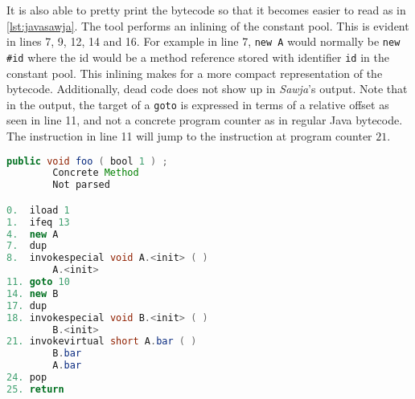 It is also able to pretty print the bytecode so that it becomes easier to read as in \cref{lst:javasawja}. 
The tool performs an inlining of the constant pool. This is evident in lines 7, 9, 12, 14 and 16. For example in line 7, \texttt{new A} would normally be \texttt{new \#id} where the id would be a method reference stored with identifier \texttt{id} in the constant pool. This inlining makes for a more compact representation of the bytecode. Additionally, dead code does not show up in \textit{Sawja}'s output.
Note that in the output, the target of a \texttt{goto} is expressed in terms of a relative offset as seen in line 11, and not a concrete program counter as in regular Java bytecode. The instruction in line 11 will jump to the instruction at program counter $21$.

\begin{minipage}{\linewidth}
\begin{lstlisting}[caption=Sawja sample. Note that the numbers on the inner left side are program counter values.,language=Java,label=lst:javasawja]
public void foo ( bool 1 ) ;
		Concrete Method
    	Not parsed

0.  iload 1
1.  ifeq 13
4.  new A
7.  dup
8.  invokespecial void A.<init> ( )
        A.<init>
11. goto 10
14. new B
17. dup
18. invokespecial void B.<init> ( )
        B.<init>
21. invokevirtual short A.bar ( )
        B.bar
        A.bar
24. pop
25. return

\end{lstlisting}
\end{minipage}